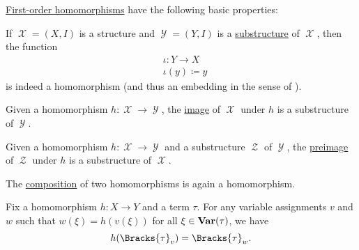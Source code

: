 \begin{proposition}\label{thm:def:first_order_homomorphism}
  \hyperref[def:first_order_homomorphism]{First-order homomorphisms} have the following basic properties:
  \begin{thmenum}
     If \( \mscrX = (X, I) \) is a structure and \( \mscrY = (Y, I) \) is a \hyperref[def:first_order_substructure]{substructure} of \( \mscrX \), then the  function
    \begin{equation}\label{thm:def:first_order_homomorphism/inclusion/canonical_inclusion}
      \begin{aligned}
        &\iota: Y \to X \\
        &\iota(y) \coloneqq y
      \end{aligned}
    \end{equation}
    is indeed a homomorphism (and thus an embedding in the sense of ).

     Given a homomorphism \( h: \mscrX \to \mscrY \), the \hyperref[def:set_valued_map/image]{image} of \( \mscrX \) under \( h \) is a substructure of \( \mscrY \).

     Given a homomorphism \( h: \mscrX \to \mscrY \) and a substructure \( \mscrZ \) of \( \mscrY \), the \hyperref[def:set_valued_map/inverse]{preimage} of \( \mscrZ \) under \( h \) is a substructure of \( \mscrX \).

     The \hyperref[def:set_valued_map/composition]{composition} of two homomorphisms is again a homomorphism.

     Fix a homomorphism \( h: X \to Y \) and a term \( \tau \). For any variable assignments \( v \) and \( w \) such that \( w(\xi) = h(v(\xi)) \) for all \( \xi \in \operatorname{\mathbf{Var}}(\tau) \), we have
    \begin{equation*}
      h(\Bracks{\tau}_v) = \Bracks{\tau}_w.
    \end{equation*}
  \end{thmenum}
\end{proposition}
